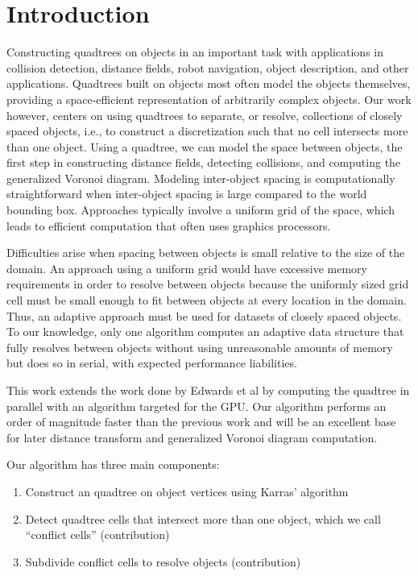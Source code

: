 \documentclass[submission]{gmp2017}
\begin{document}
\section{Introduction}
\label{sec:intro}
Constructing quadtrees on objects in an important task with applications in collision detection, distance fields, robot navigation, object description, and other applications. Quadtrees built on objects most often model the objects themselves, providing a space-efficient representation of arbitrarily complex objects. Our work however, centers on using quadtrees to separate, or resolve, collections of closely spaced objects, i.e., to construct a discretization such that no cell intersects more than one object. Using a quadtree, we can model the space between objects, the first step in constructing distance fields, detecting collisions, and computing the generalized Voronoi diagram. Modeling inter-object spacing is computationally straightforward when inter-object spacing is large compared to the world bounding box. Approaches typically involve a uniform grid of the space, which leads to efficient computation that often uses graphics processors.

Difficulties arise when spacing between objects is small relative to the size of the domain. An approach using a uniform grid would have excessive memory requirements in order to resolve between objects because the uniformly sized grid cell must be small enough to fit between objects at every location in the domain. Thus, an adaptive approach must be used for datasets of closely spaced objects. To our knowledge, only one algorithm \cite{edwards2015approximating} computes an adaptive data structure that fully resolves between objects without using unreasonable amounts of memory but does so in serial, with expected performance liabilities.

This work extends the work done by Edwards et al \cite{edwards2015approximating} by computing the quadtree in parallel with an algorithm targeted for the GPU. Our algorithm performs an order of magnitude faster than the previous work and will be an excellent base for later distance transform and generalized Voronoi diagram computation.

Our algorithm has three main components:

\begin{enumerate}
\item Construct an quadtree on object vertices using Karras' algorithm \cite{karras2012maximizing}
\item Detect quadtree cells that intersect more than one object, which we call ``conflict cells'' (contribution)
\item Subdivide conflict cells to resolve objects (contribution)
\end{enumerate}
\end{document}
